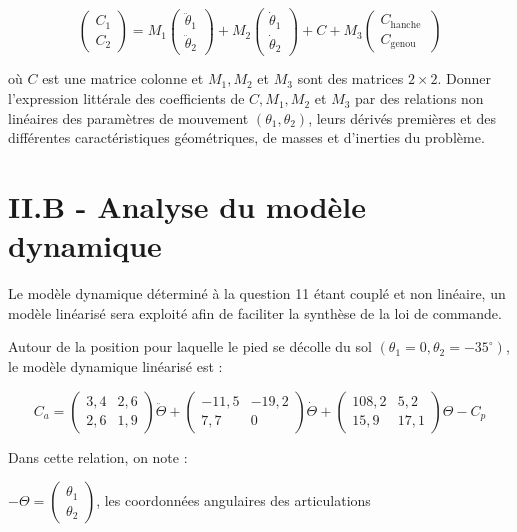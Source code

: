 \documentclass[10pt]{article}
\begin{document}
$$
\left(\begin{array}{l}
C_{1} \\
C_{2}
\end{array}\right)=M_{1}\left(\begin{array}{c}
\ddot{\theta}_{1} \\
\ddot{\theta}_{2}
\end{array}\right)+M_{2}\left(\begin{array}{c}
\dot{\theta}_{1} \\
\dot{\theta}_{2}
\end{array}\right)+C+M_{3}\left(\begin{array}{c}
C_{\text {hanche }} \\
C_{\text {genou }}
\end{array}\right)
$$

où $C$ est une matrice colonne et $M_{1}, M_{2}$ et $M_{3}$ sont des matrices $2 \times 2$. Donner l'expression littérale des coefficients de $C, M_{1}, M_{2}$ et $M_{3}$ par des relations non linéaires des paramètres de mouvement $\left(\theta_{1}, \theta_{2}\right)$, leurs dérivés premières et des différentes caractéristiques géométriques, de masses et d'inerties du problème.

\section{II.B - Analyse du modèle dynamique}
Le modèle dynamique déterminé à la question 11 étant couplé et non linéaire, un modèle linéarisé sera exploité afin de faciliter la synthèse de la loi de commande.

Autour de la position pour laquelle le pied se décolle du sol $\left(\theta_{1}=0, \theta_{2}=-35^{\circ}\right)$, le modèle dynamique linéarisé est :

$$
C_{a}=\left(\begin{array}{cc}
3,4 & 2,6 \\
2,6 & 1,9
\end{array}\right) \ddot{\Theta}+\left(\begin{array}{cc}
-11,5 & -19,2 \\
7,7 & 0
\end{array}\right) \dot{\Theta}+\left(\begin{array}{cc}
108,2 & 5,2 \\
15,9 & 17,1
\end{array}\right) \Theta-C_{p}
$$

Dans cette relation, on note :

$-\Theta=\left(\begin{array}{l}\theta_{1} \\ \theta_{2}\end{array}\right)$, les coordonnées angulaires des articulations
\end{document}
